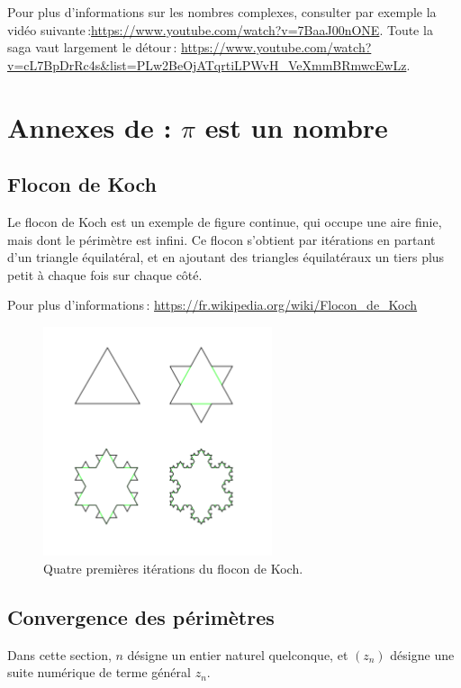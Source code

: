 		Pour plus d'informations sur les nombres complexes, consulter par exemple la vidéo suivante\,:\url{https://www.youtube.com/watch?v=7BaaJ00nONE}. Toute la saga vaut largement le détour\,: \url{https://www.youtube.com/watch?v=cL7BpDrRc4s&list=PLw2BeOjATqrtiLPWvH_VeXmmBRmwcEwLz}.


\chapter{Annexes de : $\pi$ est un nombre}
\section{Flocon de Koch}\label{app_flocon}
Le flocon de Koch est un exemple de figure continue, qui occupe une aire finie, mais dont le périmètre est infini. Ce flocon s'obtient par itérations en partant d'un triangle équilatéral, et en ajoutant des triangles équilatéraux un tiers plus petit à chaque fois sur chaque côté.

Pour plus d'informations\,: \url{https://fr.wikipedia.org/wiki/Flocon_de_Koch}

\begin{figure}[h!]
	\includegraphics[width=0.6\textwidth]{image/pi_nombre/koch.png}
	\caption{Quatre premières itérations du flocon de Koch.}
\end{figure}

\section{Convergence des périmètres}\label{app_conv}

Dans cette section, $n$ désigne un entier naturel quelconque, et $(z_n)$ désigne une suite numérique de terme général $z_n$.


